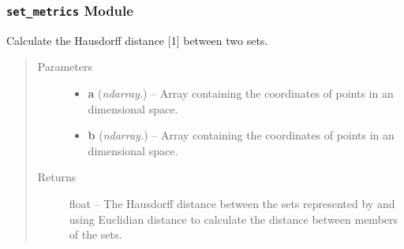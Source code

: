 \documentclass[letterpaper,10pt,english]{sphinxmanual}
\begin{document}
\subsubsection{\texttt{set\_metrics} Module}
\label{Contour.contour:module-Contour.contour.set_metrics}\label{Contour.contour:set-metrics-module}

\begin{fulllineitems}
\label{Contour.contour:Contour.contour.set_metrics.binary_find_boundaries}
\end{fulllineitems}


\begin{fulllineitems}
\label{Contour.contour:Contour.contour.set_metrics.hausdorff_distance}
Calculate the Hausdorff distance {[}1{]} between two sets.
\begin{quote}\begin{description}
\item[{Parameters}] \leavevmode\begin{itemize}
\item {} 
\textbf{a} (\emph{ndarray.}) -- Array containing the coordinates of  points in an  dimensional space.

\item {} 
\textbf{b} (\emph{ndarray.}) -- Array containing the coordinates of  points in an  dimensional space.

\end{itemize}

\item[{Returns}] \leavevmode
float -- The Hausdorff distance between the sets represented by  and  using Euclidian distance to calculate the distance between members of the sets.

\end{description}\end{quote}

\end{fulllineitems}

\end{document}
